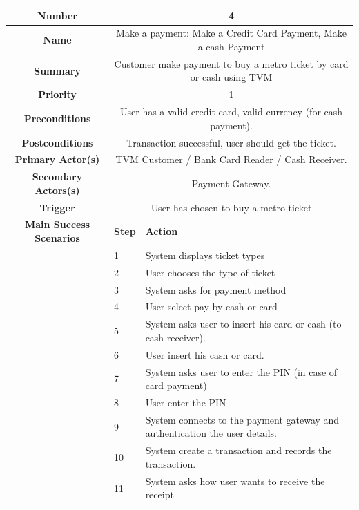 \documentclass[a4paper,12pt]{report}
\begin{document}
\begin{tabular}{ | c | p{2cm} | p{7cm} |}
	
	\hline
	\textbf{Number} & \multicolumn{2}{c|}{4}  \\
	\hline
	\textbf{Name} & \multicolumn{2}{c|}{Make a payment: Make a Credit Card Payment, Make a cash Payment}  \\
	\hline
	\textbf{Summary} & \multicolumn{2}{c|}{Customer make payment to buy a metro ticket by card or cash using TVM}  \\
	\hline
	\textbf{Priority} & \multicolumn{2}{c|}{1}  \\
	\hline
	\textbf{Preconditions} & \multicolumn{2}{c|}{User has a valid credit card, valid currency (for cash payment).}  \\
	\hline
	\textbf{Postconditions} & \multicolumn{2}{c|}{Transaction successful, user should get the ticket.}  \\
	\hline
	\textbf{Primary Actor(s)} & \multicolumn{2}{c|}{TVM Customer / Bank Card Reader / Cash Receiver.}  \\
	\hline
	\textbf{Secondary Actors(s)} & \multicolumn{2}{c|}{Payment Gateway.}  \\
	\hline
	\textbf{Trigger} & \multicolumn{2}{c|}{User has chosen to buy a metro ticket}  \\
	\hline
	\textbf{Main Success Scenarios} & \textbf{Step} & \textbf{Action} \\
	\hline
	& 1 & System displays ticket types \\ 
	\hline
	&  2  & User chooses the type of ticket \\
	\hline
	&  3  & System asks for payment method \\
	\hline
	&  4  & User select pay by cash or card \\
	\hline
	&  5  & System asks user to insert his card or cash (to cash receiver). \\
	\hline
	&  6  & User insert his cash or card. \\
	\hline
	&  7  & System asks user to enter the PIN (in case of card payment) \\
	\hline
	&  8  & User enter the PIN \\
	\hline
	&  9  & System connects to the payment gateway and authentication the user details. \\
	\hline
	&  10  & System create a transaction and records the transaction. \\
	\hline
	&  11  & System asks how user wants to receive the receipt \\

\end{tabular}
\end{document}
